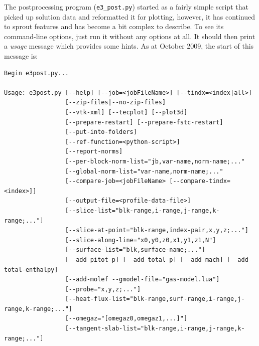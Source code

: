 \documentclass[12pt,a4paper,twoside]{article}
\begin{document}
\medskip
The postprocessing program (\texttt{e3\_post.py}) started as a fairly simple script that picked up solution data
and reformatted it for plotting, however, it has continued to sprout features and has become a bit 
complex to describe.
To see its command-line options, just run it without any options at all.
It should then print a \textit{usage} message which provides some hints.
As at October 2009, the start of this message is:

\noindent
{\footnotesize
\begin{verbatim}
Begin e3post.py...

Usage: e3post.py [--help] [--job=<jobFileName>] [--tindx=<index|all>]
                 [--zip-files|--no-zip-files]
                 [--vtk-xml] [--tecplot] [--plot3d]
                 [--prepare-restart] [--prepare-fstc-restart]
                 [--put-into-folders]
                 [--ref-function=<python-script>]
                 [--report-norms]
                 [--per-block-norm-list="jb,var-name,norm-name;..."
                 [--global-norm-list="var-name,norm-name;..."
                 [--compare-job=<jobFileName> [--compare-tindx=<index>]]
                 [--output-file=<profile-data-file>]
                 [--slice-list="blk-range,i-range,j-range,k-range;..."]
                 [--slice-at-point="blk-range,index-pair,x,y,z;..."]
                 [--slice-along-line="x0,y0,z0,x1,y1,z1,N"]
                 [--surface-list="blk,surface-name;..."]
                 [--add-pitot-p] [--add-total-p] [--add-mach] [--add-total-enthalpy]
                 [--add-molef --gmodel-file="gas-model.lua"]
                 [--probe="x,y,z;..."]
                 [--heat-flux-list="blk-range,surf-range,i-range,j-range,k-range;..."]
                 [--omegaz="[omegaz0,omegaz1,...]"]
                 [--tangent-slab-list="blk-range,i-range,j-range,k-range;..."]
\end{verbatim}
} %
\end{document}
